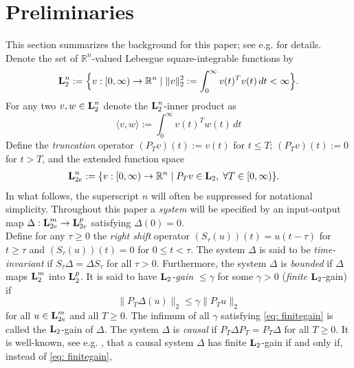 \documentclass[11pt]{article}
\def\Real{\mathbb{R}} \def\Ints{\mathbb{Z}} \def\Natural{\mathbb{N}}
\newcommand{\Ltwo}{\boldsymbol{\rm L}_{2}}
\newcommand{\Ltwoe}{\boldsymbol{\rm L}_{2e}}
\begin{document}

\section{Preliminaries}

This section summarizes the background for this paper; see e.g. \cite{Sch17} for details.
Denote the set of $\Real^n$-valued Lebesgue square-integrable functions by
\[
\Ltwo^n := \Big\{v : [0, \infty) \to \Real^n \mid  \|v\|_2^2 := \int_0^\infty v(t)^Tv(t) \, dt < \infty\Big\}.
\]
For any two $v,w \in \Ltwo^n$ denote the $\Ltwo^n$-inner product as
\[
\langle v, w \rangle := \int_0^\infty v(t)^Tw(t) \, dt
\]
Define the {\it truncation} operator $(P_Tv)(t) := v(t)$ for $t \leq T$; $(P_Tv)(t) := 0$ for $t > T$, and the extended function space
\begin{align*}
 \Ltwoe^n & := \{v : [0, \infty) \to \Real^n \mid P_Tv \in \Ltwo, \; \forall T \in [0, \infty)\}.
\end{align*}
In what follows, the superscript $n$ will often be suppressed for notational simplicity.
Throughout this paper a {\it system} will be specified by an input-output map $\Delta : \Ltwoe^m \to \Ltwoe^p$ satisfying $\Delta(0)=0$. \\
Define for any $\tau \geq 0$ the {\it right shift} operator $(S_{\tau} (u))(t) = u(t - \tau)$ for $t\geq \tau$ and $(S_{\tau} (u))(t) =0$ for $0\leq t <\tau$. The system $\Delta$ is said to be \emph{time-invariant} if $S_{\tau} \Delta = \Delta S_{\tau}$ for all $\tau > 0$. 
Furthermore, the system $\Delta$ is {\it bounded} if $\Delta$ maps $\Ltwo^m$ into $\Ltwo^p$. It is said to have {\it $\Ltwo$-gain} $\leq \gamma$ for some $\gamma > 0$ ({\it finite} $\Ltwo$-gain) if
\begin{equation}\label{eq: finitegain}
\| P_T \Delta (u) \|_2 \leq \gamma  \| P_T u\|_2
\end{equation}
for all $u \in \Ltwoe^m$ and all $T\geq 0$. The infimum of all $\gamma$ satisfying \eqref{eq: finitegain} is called the $\Ltwo$-gain of $\Delta$. 
The system $\Delta$ is \emph{causal} if $P_T \Delta P_T = P_T\Delta$ for all $T \geq 0$. It is well-known, see e.g. \cite[Proposition 1.2.3]{Sch17}, that a causal system $\Delta$ has finite $\Ltwo$-gain if and only if, instead of \eqref{eq: finitegain},
\end{document}
